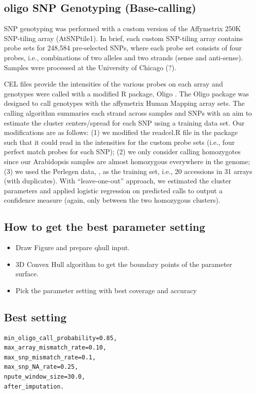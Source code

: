 \documentclass[a4paper,10pt]{article}
\begin{document}
\subsection{oligo SNP Genotyping (Base-calling)}
\label{oligo_calling}
SNP genotyping was performed with a custom version of the Affymetrix 250K SNP-tiling array (AtSNPtile1).  In brief, each custom SNP-tiling array contains probe sets for 248,584 pre-selected SNPs, where each probe set consists of four probes, i.e., combinations of two alleles and two strands (sense and anti-sense).  Samples were processed at the University of Chicago (?).

CEL files provide the intensities of the various probes on each array and genotypes were called with a modified R package, Oligo \cite{Carvalho2007}.  The Oligo package was designed to call genotypes with the affymetrix Human Mapping array sets.  The calling algorithm summaries each strand across samples and SNPs with an aim to estimate the cluster centers/spread for each SNP using a training data set.  Our modifications are as follows: (1) we modified the readcel.R file in the package such that it could read in the intensities for the custom probe sets (i.e., four perfect match probes for each SNP); (2) we only consider calling homozygotes since our Arabidopsis samples are almost homozygous everywhere in the genome; (3) we used the Perlegen data, \cite{Clark2007a}, as the training set, i.e., 20 accessions in 31 arrays (with duplicates). With “leave-one-out” approach, we estimated the cluster parameters and applied logistic regression on predicted calls to output a confidence measure (again, only between the two homozygous clusters).

\subsection{How to get the best parameter setting}
\begin{itemize}
 \item Draw Figure and prepare qhull input.
 \item 3D Convex Hull algorithm to get the boundary points of the parameter surface.
 \item Pick the parameter setting with best coverage and accuracy
\end{itemize}

\subsection{Best setting}
\begin{verbatim}
min_oligo_call_probability=0.85,
max_array_mismatch_rate=0.10,
max_snp_mismatch_rate=0.1,
max_snp_NA_rate=0.25,
npute_window_size=30.0,
after_imputation.
\end{verbatim}
\end{document}
